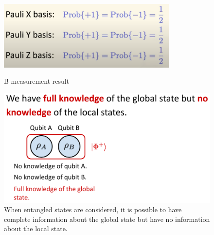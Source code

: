 \begin{figure}[H]
    \centering
    \includegraphics[width=0.8\textwidth]{lesson4/Qubit_B.pdf}
    \label{fig: 1}
    
        \caption{B measurement result}
    
\end{figure}
\fi

\begin{figure}[H]
    \centering
    \includegraphics[width=1.0\textwidth]{lesson4/4.3_Recap.pdf}
        \caption[Complete global but no local information]{When entangled states are considered, it is possible to have complete information about the global state but have no information about the local state.}
    \label{fig:incomplete-information}
\end{figure}



